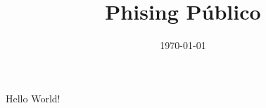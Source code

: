 \documentclass[a4paper]{article}
\title{Phising Público}
\date{\today}
\begin{document}
    \maketitle
    \tableofcontents
    \paragraph{}
    Hello World!
\end{document}
